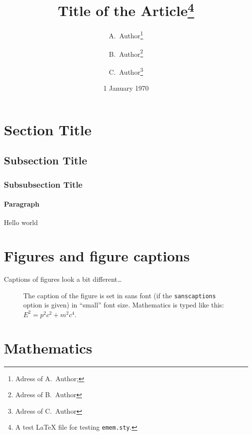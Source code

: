 \documentclass[10pt,oneside,article]{memoir}
\title{Title of the Article\thanks{A test {\LaTeX} file for testing \texttt{emem.sty}.}}
\author{%
  A.~Author\thanks{Adress of A.~Author; \email{a.author@mail.zz}} \and%
  B.~Author\thanks{Adress of B.~Author} \and%
  C.~Author\thanks{Adress of C.~Author}%
}
\date{1 January 1970}
\begin{document}
\maketitle

\begin{abstract}
  \lipsum[1]
\end{abstract}

\section{Section Title}
\lipsum[1]

\subsection{Subsection Title}
\lipsum[2]

\subsubsection{Subsubsection Title}
\lipsum[3]

\paragraph{Paragraph}
\lipsum[4]


\makeatletter
  \def\Inter@scale{0.8}
\makeatother
{\selectfont Hello world}

\section{Figures and figure captions}

Captions of figures look a bit different\ldots
\begin{figure}[h]
  \begin{center}
  \end{center}
  \caption{The caption of the figure is set in sans font (if the \texttt{sanscaptions} option is given) in ``small'' font size.  Mathematics is typed like this: $E^2=p^2c^2 + m^2c^4$.}
\end{figure}

\section{Mathematics}
\end{document}
